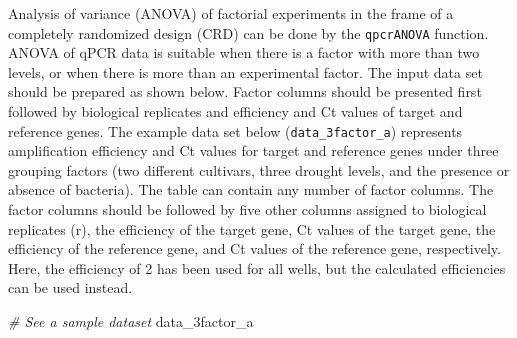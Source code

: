 \documentclass[
]{article}
\newenvironment{Shaded}{\begin{snugshade}}{\end{snugshade}}
\newcommand{\CommentTok}[1]{\textcolor[rgb]{0.56,0.35,0.01}{\textit{#1}}}
\newcommand{\NormalTok}[1]{#1}
\begin{document}
Analysis of variance (ANOVA) of factorial experiments in the frame of a
completely randomized design (CRD) can be done by the \texttt{qpcrANOVA}
function. ANOVA of qPCR data is suitable when there is a factor with
more than two levels, or when there is more than an experimental factor.
The input data set should be prepared as shown below. Factor columns
should be presented first followed by biological replicates and
efficiency and Ct values of target and reference genes. The example data
set below (\texttt{data\_3factor\_a}) represents amplification
efficiency and Ct values for target and reference genes under three
grouping factors (two different cultivars, three drought levels, and the
presence or absence of bacteria). The table can contain any number of
factor columns. The factor columns should be followed by five other
columns assigned to biological replicates (r), the efficiency of the
target gene, Ct values of the target gene, the efficiency of the
reference gene, and Ct values of the reference gene, respectively. Here,
the efficiency of 2 has been used for all wells, but the calculated
efficiencies can be used instead.

\begin{Shaded}
\begin{Highlighting}[]
\CommentTok{\# See a sample dataset}
\NormalTok{data\_3factor\_a}
\end{Highlighting}
\end{Shaded}
\end{document}
